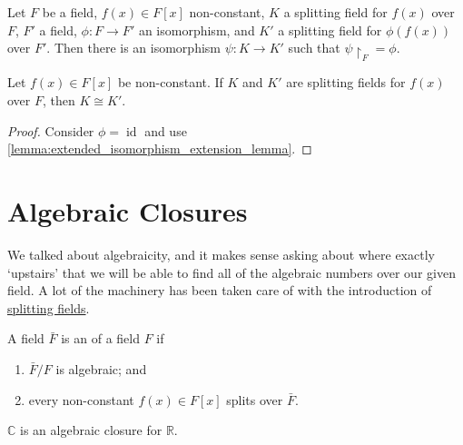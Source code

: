 \documentclass[notoc,notitlepage]{tufte-book}
\DeclareMathOperator{\id}{id}
\begin{document}
\begin{lemma}\label{lemma:extended_isomorphism_extension_lemma}
  Let $F$ be a field, $f(x) \in F[x]$ non-constant, $K$ a splitting field for $f(x)$ over $F$,
  $F'$ a field, $\phi : F \to F'$ an isomorphism, and $K'$ a splitting field for $\phi(f(x))$
  over $F'$. Then there is an isomorphism $\psi : K \to K'$ such that $\psi \restriction_F = \phi$.
\end{lemma}

\begin{crly}\label{crly:splitting_fields_are_unique_up_to_isomorphism}
  Let $f(x) \in F[x]$ be non-constant. If $K$ and $K'$ are splitting fields for $f(x)$ over $F$,
  then $K \cong K'$.
\end{crly}

\begin{proof}
  Consider $\phi = \id$ and use \cref{lemma:extended_isomorphism_extension_lemma}.
\end{proof}


\section{Algebraic Closures}%
\label{sec:algebraic_closures}

We talked about algebraicity, and it makes sense asking about where exactly `upstairs' that
we will be able to find all of the algebraic numbers over our given field. A lot of the
machinery has been taken care of with the introduction of 
\hyperref[sec:splitting_fields]{splitting fields}.

\begin{defn}\label{defn:algebraic_closures}
  A field $\bar{F}$ is an  of a field $F$ if
  \begin{enumerate}
    \item $\bar{F} / F$ is algebraic; and
    \item every non-constant $f(x) \in F[x]$ splits over $\bar{F}$.
  \end{enumerate}
\end{defn}

\begin{eg}
  $\mathbb{C}$ is an algebraic closure for $\mathbb{R}$.
\end{eg}
\end{document}
